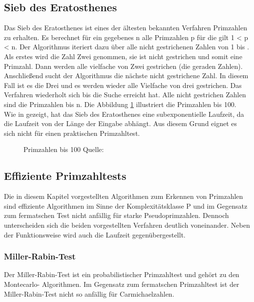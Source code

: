 	\subsection{Sieb des Eratosthenes}
	Das Sieb des Eratosthenes ist eines der ältesten bekannten Verfahren Primzahlen zu erhalten. Es berechnet für ein gegebenes n \myin {} alle Primzahlen p \myin {} für die gilt 1 < p < n. Der Algorithmus iteriert dazu über alle nicht gestrichenen Zahlen von 1 bis . Als erstes wird die Zahl Zwei genommen, sie ist nicht gestrichen und somit eine Primzahl. Dann werden alle vielfache von Zwei gestrichen (die geraden Zahlen). Anschließend sucht der Algorithmus die nächste nicht gestrichene Zahl. In diesem Fall ist es die Drei und es werden wieder alle Vielfache von drei gestrichen. Das Verfahren wiederholt sich bis die Suche  erreicht hat. Alle nicht gestrichen Zahlen sind die Primzahlen bis n. Die Abbildung \ref{ABBILDUNG_Primzahlen_100} illustriert die Primzahlen bis 100.
	Wie in \cite{Algebraische:und:zahlentheoretische:Grundlagen:fuer:die:Informatik} gezeigt, hat das Sieb des Eratosthenes eine subexponentielle Laufzeit, da die Laufzeit von der Länge der Eingabe abhängt. Aus diesem Grund eignet es sich nicht für einen praktischen Primzahltest.
	\begin{figure}
		\centering
		\caption{Primzahlen bis 100 Quelle: \cite{Mathe:Lexikon:SiebDesEratosthenes}}
		\label{ABBILDUNG_Primzahlen_100}
	\end{figure}
	
	\subsection{Effiziente Primzahltests} \label{Effiziente Primzahltests}
		Die in diesem Kapitel vorgestellten Algorithmen zum Erkennen von Primzahlen sind effiziente Algorithmen im Sinne der Komplexitätsklasse P und im Gegensatz zum fermatschen Test nicht anfällig für starke Pseudoprimzahlen. Dennoch unterscheiden sich die beiden vorgestellten Verfahren deutlich voneinander. Neben der Funktionsweise wird auch die Laufzeit gegenübergestellt.
		
		\subsubsection{Miller-Rabin-Test}
		 Der Miller-Rabin-Test ist ein probabilistischer Primzahltest und gehört zu den Montecarlo- Algorithmen. Im Gegensatz zum fermatschen Primzahltest ist der Miller-Rabin-Test nicht so anfällig für Carmichaelzahlen.
		
